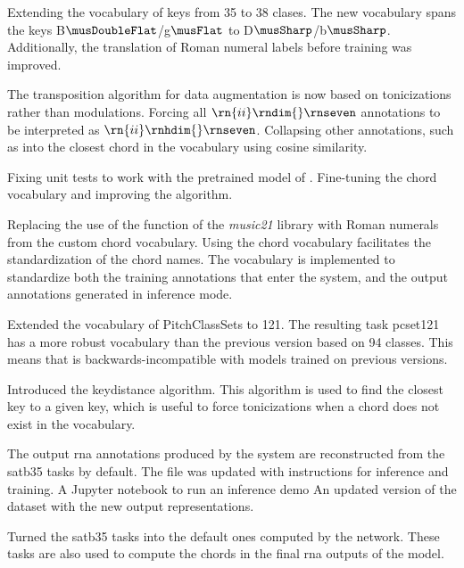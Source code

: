 Extending the vocabulary of keys from 35 to 38 clases. The
new vocabulary spans the keys B$\musDoubleFlat$/g$\musFlat$
to D$\musSharp$/b$\musSharp$. Additionally, the translation
of Roman numeral labels before training was improved.

The transposition algorithm for data augmentation is now
based on tonicizations rather than modulations. Forcing all
$\rn{ii}\rndim{}\rnseven$ annotations to be interpreted as
$\rn{ii}\rnhdim{}\rnseven$. Collapsing other annotations,
such as  into the closest chord in the vocabulary
using cosine similarity.

Fixing unit tests to work with the pretrained model of
. Fine-tuning the chord vocabulary and
improving the  algorithm.

Replacing the use of the 
function of the \emph{music21}
\parencite{cuthbert2010music21} library with Roman numerals
from the custom chord vocabulary. Using the chord vocabulary
facilitates the standardization of the chord names. The
vocabulary is implemented to standardize both the training
annotations that enter the system, and the output
annotations generated in inference mode.

Extended the vocabulary of PitchClassSets to 121. The
resulting task \gls{pcset121} has a more robust vocabulary
than the previous version based on 94 classes. This means
that  is backwards-incompatible with models
trained on previous versions.


Introduced the keydistance algorithm. This algorithm is used
to find the closest key to a given key, which is useful to
force tonicizations when a chord does not exist in the
vocabulary.

The output \gls{rna} annotations produced by the system are
reconstructed from the \gls{satb35} tasks by default. The
 file was updated with instructions for
inference and training. A Jupyter notebook
\textcite{kluyver2016jupyter} to run an inference demo An
updated version of the dataset with the new output
representations.

Turned the \gls{satb35} tasks into the default ones computed
by the network. These tasks are also used to compute the
chords in the final \gls{rna} outputs of the model.

